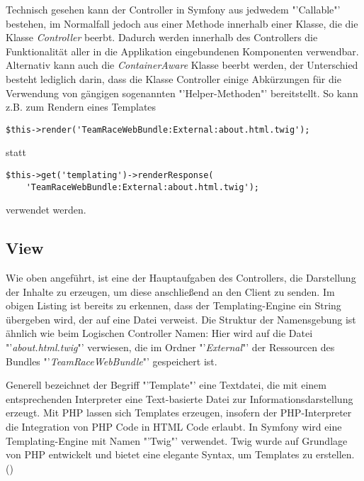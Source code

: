 \documentclass[12pt]{report}
\begin{document}
Technisch gesehen kann der Controller in Symfony aus jedwedem "'Callable"' bestehen, im Normalfall jedoch aus einer Methode innerhalb einer Klasse, die die Klasse \emph{Controller} beerbt. Dadurch werden innerhalb des Controllers die Funktionalität aller in die Applikation eingebundenen Komponenten verwendbar. Alternativ kann auch die \emph{ContainerAware} Klasse beerbt werden, der Unterschied besteht lediglich darin, dass die Klasse Controller einige Abkürzungen für die Verwendung von gängigen sogenannten "'Helper-Methoden"' bereitstellt. So kann z.B. zum Rendern eines Templates

\begin{lstlisting}
$this->render('TeamRaceWebBundle:External:about.html.twig');
\end{lstlisting}
statt 
\begin{lstlisting}
$this->get('templating')->renderResponse(
	'TeamRaceWebBundle:External:about.html.twig');
\end{lstlisting}
verwendet werden.

\subsection{View}

Wie oben angeführt, ist eine der Hauptaufgaben des Controllers, die Darstellung der Inhalte zu erzeugen, um diese anschließend an den Client zu senden. Im obigen Listing ist bereits zu erkennen, dass der Templating-Engine ein String übergeben wird, der auf eine Datei verweist. Die Struktur der Namensgebung ist ähnlich wie beim Logischen Controller Namen: Hier wird auf die Datei "'\emph{about.html.twig}"' verwiesen, die im Ordner "'\emph{External}"' der Ressourcen des Bundles "'\emph{TeamRaceWebBundle}"' gespeichert ist.

Generell bezeichnet der Begriff "'Template"' eine Textdatei, die mit einem entsprechenden Interpreter eine Text-basierte Datei zur Informationsdarstellung erzeugt. Mit PHP lassen sich Templates erzeugen, insofern der PHP-Interpreter die Integration von PHP Code in HTML Code erlaubt. In Symfony wird eine Templating-Engine mit Namen "'Twig"' verwendet. Twig wurde auf Grundlage von PHP entwickelt und bietet eine elegante Syntax, um Templates zu erstellen. (\cite{sf2:Templates}) 
\end{document}
